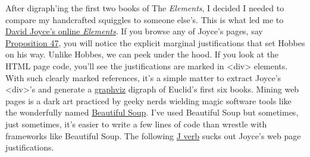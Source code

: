 After digraph'ing the first two books of The \emph{Elements}, I decided
I needed to compare my handcrafted squiggles to someone else's. This is
what led me to
\href{https://mathcs.clarku.edu/~djoyce/elements/aboutText.html}{David
Joyce's online \emph{Elements}}. If you browse any of Joyce's pages, say
\href{https://mathcs.clarku.edu/~djoyce/elements/bookI/propI47.html}{Proposition
47}, you will notice the explicit marginal justifications that set
Hobbes on his way. Unlike Hobbes, we can peek under the hood. If you
look at the HTML page code, you'll see the justifications are marked in
\textless div\textgreater{} elements. With such clearly marked
references, it's a simple matter to extract Joyce's
\textless div\textgreater's and generate a
\href{https://graphviz.org/}{graphviz} digraph of Euclid's first six
books. Mining web pages is a dark art practiced by geeky nerds wielding
magic software tools like the wonderfully named
\href{https://beautiful-soup-4.readthedocs.io/en/latest/}{Beautiful
Soup}. I've used Beautiful Soup but sometimes, just sometimes, it's
easier to write a few lines of code than wrestle with frameworks like
Beautiful Soup. The following
\href{https://code.jsoftware.com/wiki/Main_Page}{J verb} sucks out
Joyce's web page justifications.

\begin{Shaded}
\begin{Highlighting}[]
\KeywordTok{=:} 


\KeywordTok{,}\KeywordTok{,}
\RegionMarkerTok{(}\KeywordTok{,}\KeywordTok{\&} \RegionMarkerTok{(}\KeywordTok{]} \KeywordTok{\&}\KeywordTok{\textasciitilde{}}   \KeywordTok{]}\RegionMarkerTok{)}  \RegionMarkerTok{)}  
\RegionMarkerTok{)}
\end{Highlighting}
\end{Shaded}

